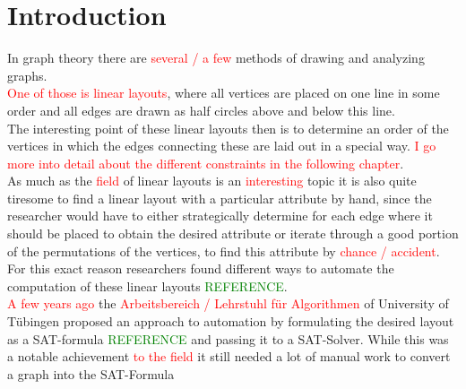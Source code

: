 
\chapter{Introduction}\label{Introduction}

In graph theory there are \textcolor{red}{several / a few} methods of drawing and analyzing graphs. \\
\textcolor{red}{One of those is linear layouts}, where all vertices are placed on one line in some order and all edges are drawn as half circles above and below this line.\\
The interesting point of these linear layouts then is to determine an order of the vertices in which the edges connecting these are laid out in a special way. \textcolor{red}{I go more into detail about the different constraints in the following chapter}.\\
As much as the \textcolor{red}{field} of linear layouts is an \textcolor{red}{interesting} topic it is also quite tiresome to find a linear layout with a particular attribute by hand, since the researcher would have to either strategically determine for each edge where it should be placed to obtain the desired attribute or iterate through a good portion of the permutations of the vertices, to find this attribute by \textcolor{red}{chance / accident}.\\
For this exact reason researchers found different ways to automate the computation of these linear layouts \textcolor{green}{REFERENCE}.\\
\textcolor{red}{A few years ago} the \textcolor{red}{Arbeitsbereich / Lehrstuhl für Algorithmen} of University of Tübingen proposed an approach to automation by formulating the desired layout as a SAT-formula \textcolor{green}{REFERENCE} and passing it to a SAT-Solver. While this was a notable achievement \textcolor{red}{to the field} it still needed a lot of manual work to convert a graph into the SAT-Formula

